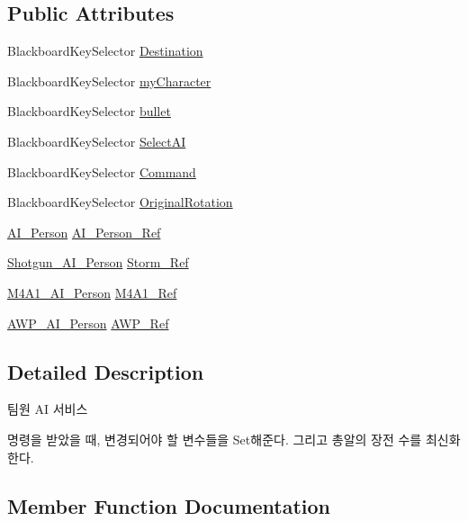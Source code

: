 \subsection*{Public Attributes}
\begin{DoxyCompactItemize}
\item 
Blackboard\+Key\+Selector \hyperlink{class_service___destination_aab020987fc86e7bc721b2b9ecdd6d9f8}{Destination}
\item 
Blackboard\+Key\+Selector \hyperlink{class_service___destination_aa01c366172f8b80aade716cba21820b1}{my\+Character}
\item 
Blackboard\+Key\+Selector \hyperlink{class_service___destination_a29222990051632bee7d566e6ea357749}{bullet}
\item 
Blackboard\+Key\+Selector \hyperlink{class_service___destination_a3bf42785905cc363414a52b61274b793}{Select\+AI}
\item 
Blackboard\+Key\+Selector \hyperlink{class_service___destination_a9d8b0d0d538b168a18c01c411a86afe3}{Command}
\item 
Blackboard\+Key\+Selector \hyperlink{class_service___destination_adb4d684a452e88b7bbf0a1ece04f21e1}{Original\+Rotation}
\item 
\hyperlink{class_a_i___person}{A\+I\+\_\+\+Person} \hyperlink{class_service___destination_a5467a698caf1e5021d6d2cc5aa2f7742}{A\+I\+\_\+\+Person\+\_\+\+Ref}
\item 
\hyperlink{class_shotgun___a_i___person}{Shotgun\+\_\+\+A\+I\+\_\+\+Person} \hyperlink{class_service___destination_aa76646438b2f815ef439bd27d5514d4b}{Storm\+\_\+\+Ref}
\item 
\hyperlink{class_m4_a1___a_i___person}{M4\+A1\+\_\+\+A\+I\+\_\+\+Person} \hyperlink{class_service___destination_aae5ce87069ea53c012fcca9b99d18d51}{M4\+A1\+\_\+\+Ref}
\item 
\hyperlink{class_a_w_p___a_i___person}{A\+W\+P\+\_\+\+A\+I\+\_\+\+Person} \hyperlink{class_service___destination_aafe01afb61466c81ccb80e7c5c5d43ee}{A\+W\+P\+\_\+\+Ref}
\end{DoxyCompactItemize}


\subsection{Detailed Description}
팀원 AI 서비스 

명령을 받았을 때, 변경되어야 할 변수들을 Set해준다. 그리고 총알의 장전 수를 최신화한다. 

\subsection{Member Function Documentation}
